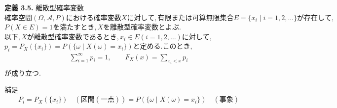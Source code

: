 \documentclass[dvipdfmx,10pt, a4j]{jarticle}
\theoremstyle{definition}
\begin{document}
    \newpage
    \noindent
    \textbf{定義 3.5.} 離散型確率変数\\
    $確率空間 (\Omega, \mathcal{A}, P) における確率変数 X に対して, 有限または可算無限集合 E = \{x_i \mid i = 1, 2, \dots\} が存在して,$
    $P(X \in E) = 1 を満たすとき, X を \textbf{離散型確率変数} とよぶ.$\\
    $以下, X が離散型確率変数であるとき, x_i \in E (i = 1, 2, \dots) に対して, $\\
    $p_i = P_X(\{x_i\}) = P(\{\omega \mid X(\omega) = x_i\})と定める. このとき,$\\
    \begin{align*}
        \sum_{i=1}^{\infty}{p_i} = 1, \qquad F_X(x) = \sum_{x_i < x}{p_i}\\
    \end{align*}
    が成り立つ.\\
    \begin{itembox}[l]{補足}
        \begin{align*}
            P_i = P_X(\{x_i\}) \quad (区間 (一点)) = P(\{\omega \mid X(\omega) = x_i\}) \quad (事象)\\
        \end{align*}
    \end{itembox}\\
    
\end{document}

